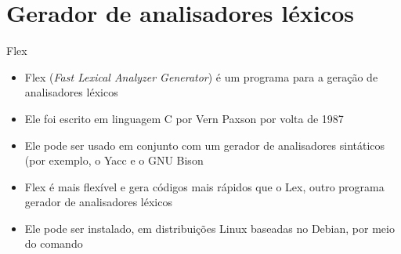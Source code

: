 \section{Gerador de analisadores léxicos}

\begin{frame}[fragile]{Flex}

    \begin{itemize}
        \item Flex (\textit{Fast Lexical Analyzer Generator}) é um programa para a geração de analisadores léxicos
        \pause

        \item Ele foi escrito em linguagem C por Vern Paxson por volta de 1987
        \pause

        \item Ele pode ser usado em conjunto com um gerador de analisadores sintáticos (por exemplo, o Yacc e o GNU Bison
        \pause

        \item Flex é mais flexível e gera códigos mais rápidos que o Lex, outro programa gerador de analisadores léxicos
        \pause

        \item Ele pode ser instalado, em distribuições Linux baseadas no Debian, por meio do comando
    \end{itemize}

\end{frame}

